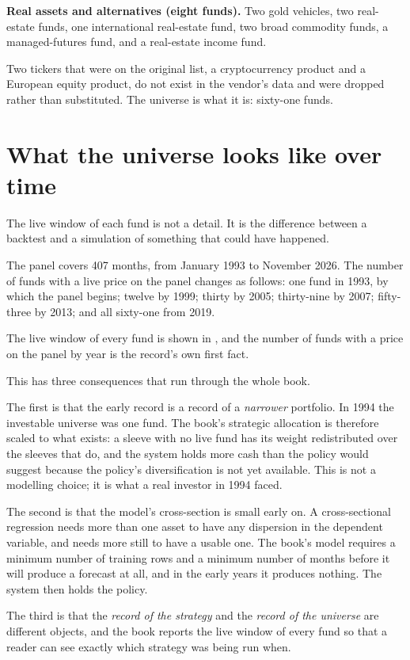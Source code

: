 \textbf{Real assets and alternatives (eight funds).} Two gold vehicles, two
real-estate funds, one international real-estate fund, two broad commodity
funds, a managed-futures fund, and a real-estate income fund.

Two tickers that were on the original list, a cryptocurrency product and a
European equity product, do not exist in the vendor's data and were
dropped rather than substituted. The universe is what it is: sixty-one
funds.

\section{What the universe looks like over time}

The live window of each fund is not a detail. It is the difference between
a backtest and a simulation of something that could have happened.

The panel covers 407 months, from January 1993 to November 2026. The
number of funds with a live price on the panel changes as follows: one
fund in 1993, by which the panel begins; twelve by 1999; thirty by 2005;
thirty-nine by 2007; fifty-three by 2013; and all sixty-one from 2019.

The live window of every fund is shown in , and the number of funds with a price on the panel by year is the record's own first fact.

This has three consequences that run through the whole book.

The first is that the early record is a record of a \emph{narrower}
portfolio. In 1994 the investable universe was one fund. The book's
strategic allocation is therefore scaled to what exists: a sleeve with no
live fund has its weight redistributed over the sleeves that do, and the
system holds more cash than the policy would suggest because the policy's
diversification is not yet available. This is not a modelling choice; it
is what a real investor in 1994 faced.

The second is that the model's cross-section is small early on. A
cross-sectional regression needs more than one asset to have any
dispersion in the dependent variable, and needs more still to have a
usable one. The book's model requires a minimum number of training rows
and a minimum number of months before it will produce a forecast at all,
and in the early years it produces nothing. The system then holds the
policy.

The third is that the \emph{record of the strategy} and the \emph{record of
the universe} are different objects, and the book reports the live window
of every fund so that a reader can see exactly which strategy was being
run when.


